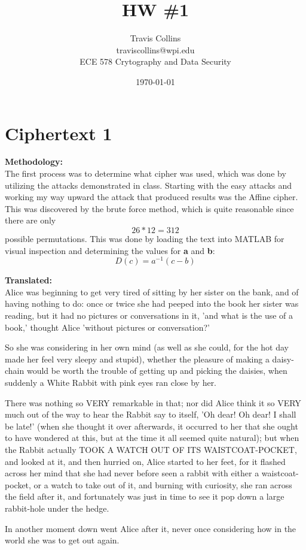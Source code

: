\documentclass[12pt]{article}
\title{HW \#1}
\author{
        Travis Collins \\
	traviscollins@wpi.edu \\
	ECE 578 Crytography and Data Security
}
\date{\today}
\begin{document}
\maketitle

\section{Ciphertext 1}
\textbf{Methodology:}\\
The first process was to determine what cipher was used, which was done by utilizing the attacks demonstrated in class.  Starting with the easy attacks and working my way upward the attack that produced results was the Affine cipher.  This was discovered by the brute force method, which is quite reasonable since there are only \[ 26 * 12 = 312 \] possible permutations.  This was done by loading the text into MATLAB for visual inspection and determining the values for \textbf{a} and \textbf{b}: \[D(c)=a^{-1}(c-b)\]

\noindent
\textbf{Translated:}\\
Alice was beginning to get very tired of sitting by her sister on the
bank, and of having nothing to do: once or twice she had peeped into the
book her sister was reading, but it had no pictures or conversations in
it, ’and what is the use of a book,’ thought Alice ’without pictures or
conversation?’

So she was considering in her own mind (as well as she could, for the
hot day made her feel very sleepy and stupid), whether the pleasure
of making a daisy-chain would be worth the trouble of getting up and
picking the daisies, when suddenly a White Rabbit with pink eyes ran
close by her.

There was nothing so VERY remarkable in that; nor did Alice think it so
VERY much out of the way to hear the Rabbit say to itself, ’Oh dear!
Oh dear! I shall be late!’ (when she thought it over afterwards, it
occurred to her that she ought to have wondered at this, but at the time
it all seemed quite natural); but when the Rabbit actually TOOK A WATCH
OUT OF ITS WAISTCOAT-POCKET, and looked at it, and then hurried on,
Alice started to her feet, for it flashed across her mind that she had
never before seen a rabbit with either a waistcoat-pocket, or a watch
to take out of it, and burning with curiosity, she ran across the field
after it, and fortunately was just in time to see it pop down a large
rabbit-hole under the hedge.

In another moment down went Alice after it, never once considering how
in the world she was to get out again.
\end{document}
